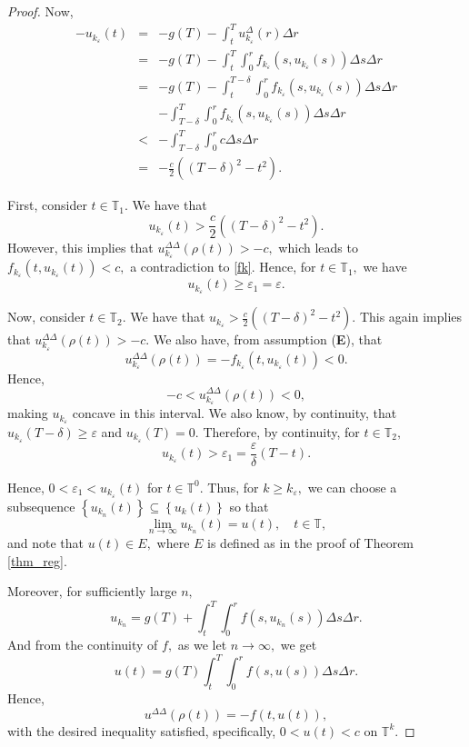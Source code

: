\documentclass[12pt,reqno]{amsart}
\begin{document}
\begin{proof}
	Now,
	\begin{eqnarray*}
		-u_{k_{\varepsilon}}(t) & = &-g(T)- \int_{t}^{T} u_{k_{\varepsilon}}^{\Delta}(r) \Delta r \\
		& = & -g(T)- \int_{t}^{T} \int_{0}^{r} f_{k_{\varepsilon}}(s, u_{k_{\varepsilon}}(s)) \Delta s \Delta r \\
		& = & -g(T)- \int_{t}^{T-\delta} \int_{0}^{r} f_{k_{\varepsilon}}(s, u_{k_{\varepsilon}}(s)) \Delta s \Delta r \\
		&   & - \int_{T-\delta}^{T} \int_{0}^{r} f_{k_{\varepsilon}}(s, u_{k_{\varepsilon}}(s)) \Delta s \Delta r \\
		& < & - \int_{T-\delta}^{T} \int_{0}^{r} c \Delta s \Delta r \\
		& = & - \frac{c}{2} \left((T-\delta)^2 - t^2\right).
	\end{eqnarray*}
	
	First, consider $t \in \mathbb{T}_1.$  We have that $$u_{k_{\varepsilon}}(t) > \frac{c}{2} \left((T-\delta)^2 - t^2\right).$$  However, this implies that $u_{k_{\varepsilon}}^{\Delta\Delta}(\rho(t)) > -c,$ which leads to $f_{k_{\varepsilon}}(t, u_{k_{\varepsilon}}(t)) < c,$ a contradiction to \eqref{fk}.  Hence, for $t \in \mathbb{T}_1,$ we have $$u_{k_{\varepsilon}}(t) \geq \varepsilon_1 = \varepsilon.$$
	
	Now, consider $t \in \mathbb{T}_2.$  We have that $u_{k_{\varepsilon}} > \frac{c}{2} \left((T-\delta)^2 - t^2\right).$  This again implies that $u_{k_{\varepsilon}}^{\Delta\Delta}(\rho(t)) > -c.$  We also have, from assumption (\textbf{E}), that $$u_{k_{\varepsilon}}^{\Delta\Delta}(\rho(t)) = - f_{k_{\varepsilon}}(t, u_{k_{\varepsilon}}(t)) < 0.$$  Hence, $$-c < u_{k_{\varepsilon}}^{\Delta\Delta}(\rho(t)) < 0,$$ making $u_{k_{\varepsilon}}$ concave in this interval.  We also know, by continuity, that $u_{k_{\varepsilon}}(T-\delta) \geq \varepsilon$ and $u_{k_{\varepsilon}}(T) = 0.$  Therefore, by continuity, for $t \in \mathbb{T}_2,$ $$u_{k_{\varepsilon}}(t) > \varepsilon_1 = \frac{\varepsilon}{\delta} (T-t).$$
	
	Hence, $0 < \varepsilon_1 < u_{k_{\varepsilon}}(t)$ for $t \in \mathbb{T}^0.$
	Thus, for $k \geq k_{\varepsilon},$ we can choose a subsequence $\left\{u_{k_{n}}(t)\right\} \subseteq \left\{u_{k}(t)\right\}$ so that $$\lim\limits_{n \rightarrow \infty} u_{k_{n}}(t) = u(t), \quad t \in \mathbb{T},$$ and note that $u(t) \in E,$ where $E$ is defined as in the proof of Theorem \ref{thm_reg}.
     
    Moreover, for sufficiently large $n,$ $$u_{k_{n}} = g(T)+\int_{t}^{T} \int_{0}^{r} f(s, u_{k_{n}}(s)) \Delta s \Delta r.$$  And from the continuity of $f,$ as we let $n \rightarrow \infty,$ we get $$u(t) =g(T)\int_{t}^{T} \int_{0}^{r} f(s, u(s)) \Delta s \Delta r.$$  Hence, $$u^{\Delta\Delta}(\rho(t)) = -f(t, u(t)),$$ with the desired inequality satisfied, specifically, $0 < u(t) < c$ on $\mathbb{T}^k.$

\end{proof}
\end{document}
